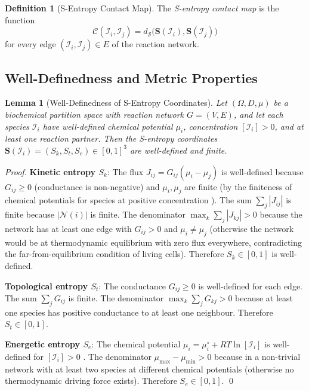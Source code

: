 \documentclass[11pt,twocolumn]{article}
\theoremstyle{plain}
\newtheorem{lemma}[theorem]{Lemma}
\theoremstyle{definition}
\newtheorem{definition}[theorem]{Definition}
\newcommand{\CC}{\mathcal{C}}
\newcommand{\Sk}{S_k}
\newcommand{\St}{S_t}
\newcommand{\Se}{S_e}
\newcommand{\bS}{\mathbf{S}}
\newcommand{\dS}{d_{\mathcal{S}}}
\begin{document}
\begin{definition}[S-Entropy Contact Map]
\label{def:sentropy_contact_map}
The \emph{S-entropy contact map} is the function
\begin{equation}\label{eq:CM}
  \CC(\mathcal{I}_i, \mathcal{I}_j)
  = \dS\bigl(\bS(\mathcal{I}_i), \bS(\mathcal{I}_j)\bigr)
\end{equation}
for every edge $(\mathcal{I}_i, \mathcal{I}_j) \in E$ of the reaction network.
\end{definition}

\subsection{Well-Definedness and Metric Properties}

\begin{lemma}[Well-Definedness of S-Entropy Coordinates]
\label{lem:well_defined}
Let $(\Omega, D, \mu)$ be a biochemical partition space with reaction network
$G = (V, E)$, and let each species $\mathcal{I}_i$ have well-defined chemical
potential $\mu_i$, concentration $[\mathcal{I}_i] > 0$, and at least one
reaction partner. Then the S-entropy coordinates $\bS(\mathcal{I}_i) =
(\Sk, \St, \Se) \in [0,1]^3$ are well-defined and finite.
\end{lemma}

\begin{proof}
\textbf{Kinetic entropy $\Sk$}: The flux $J_{ij} = G_{ij}(\mu_i - \mu_j)$ is
well-defined because $G_{ij} \geq 0$ (conductance is non-negative) and $\mu_i,
\mu_j$ are finite (by the finiteness of chemical potentials for species at
positive concentration \cite{atkins2014physical}). The sum $\sum_j |J_{ij}|$ is
finite because $|\mathcal{N}(i)|$ is finite. The denominator $\max_k \sum_j
|J_{kj}| > 0$ because the network has at least one edge with $G_{ij} > 0$ and
$\mu_i \neq \mu_j$ (otherwise the network would be at thermodynamic equilibrium
with zero flux everywhere, contradicting the far-from-equilibrium condition of
living cells). Therefore $\Sk \in [0,1]$ is well-defined.

\textbf{Topological entropy $\St$}: The conductance $G_{ij} \geq 0$ is
well-defined for each edge. The sum $\sum_j G_{ij}$ is finite. The denominator
$\max_k \sum_j G_{kj} > 0$ because at least one species has positive
conductance to at least one neighbour. Therefore $\St \in [0,1]$.

\textbf{Energetic entropy $\Se$}: The chemical potential $\mu_i = \mu_i^\circ
+ RT \ln[\mathcal{I}_i]$ is well-defined for $[\mathcal{I}_i] > 0$
\cite{atkins2014physical}. The denominator $\mu_{\max} - \mu_{\min} > 0$
because in a non-trivial network with at least two species at different chemical
potentials (otherwise no thermodynamic driving force exists). Therefore
$\Se \in [0,1]$. \qed
\end{proof}
\end{document}
